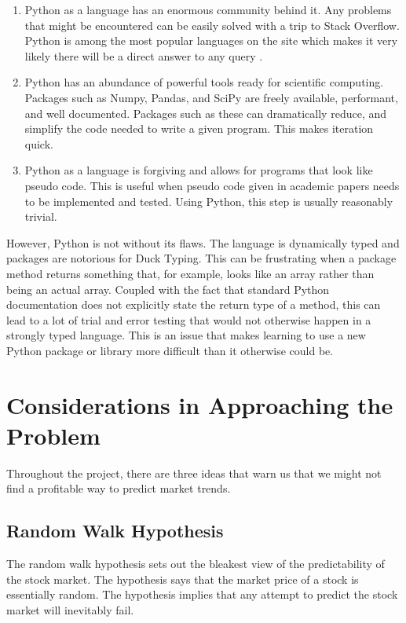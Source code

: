 \documentclass{report}
\begin{document}
\begin{enumerate}
  \item Python as a language has an enormous community behind it. Any problems that might be encountered can be easily solved with a trip to Stack Overflow. Python is among the most popular languages on the site which makes it very likely there will be a direct answer to any query \cite{website:redmonk-languages}. 
  
  \item Python has an abundance of powerful tools ready for scientific computing. Packages such as Numpy, Pandas, and SciPy are freely available, performant, and well documented. Packages such as these can dramatically reduce, and simplify the code needed to write a given program. This makes iteration quick.

  \item Python as a language is forgiving and allows for programs that look like pseudo code. This is useful when pseudo code given in academic papers needs to be implemented and tested. Using Python, this step is usually reasonably trivial.

\end{enumerate}

However, Python is not without its flaws. The language is dynamically typed and packages are notorious for Duck Typing. This can be frustrating when a package method returns something that, for example, looks like an array rather than being an actual array. Coupled with the fact that standard Python documentation does not explicitly state the return type of a method, this can lead to a lot of trial and error testing that would not otherwise happen in a strongly typed language. This is an issue that makes learning to use a new Python package or library more difficult than it otherwise could be.

\chapter{Considerations in Approaching the Problem}

Throughout the project, there are three ideas that warn us that we might not find a profitable way to predict market trends.

\section{Random Walk Hypothesis}

The random walk hypothesis sets out the bleakest view of the predictability of the stock market. The hypothesis says that the market price of a stock is essentially random. The hypothesis implies that any attempt to predict the stock market will inevitably fail. 
\end{document}
